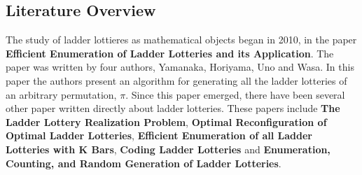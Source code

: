 \subsection{Literature Overview}
    The study of ladder lottieres as mathematical objects began in 2010, in  the paper
    \textbf{Efficient Enumeration of Ladder Lotteries and its Application}. The paper was 
    written by four authors, Yamanaka, Horiyama, Uno and Wasa. In this paper the 
    authors present an algorithm for generating all the ladder lotteries of an 
    arbitrary permutation, $\pi$. Since this paper emerged, there have been 
    several other paper written directly about ladder lotteries. 
    These papers include \textbf{The Ladder Lottery Realization Problem},
    \textbf{Optimal Reconfiguration of Optimal Ladder Lotteries}, 
    \textbf{Efficient Enumeration of all Ladder Lotteries with K Bars},
    \textbf{Coding Ladder Lotteries} and
    \textbf{Enumeration, Counting, and Random Generation of Ladder Lotteries}.


\pagebreak



\par


\par 


